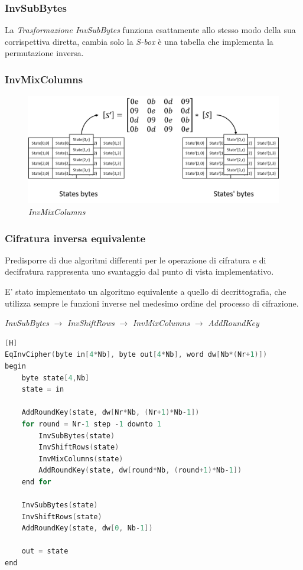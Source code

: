 \documentclass[a4paper,11pt]{article}
\begin{document}
\subsubsection{InvSubBytes}
La \textit{Trasformazione InvSubBytes} funziona esattamente allo stesso modo della sua corrispettiva diretta, cambia solo la \textit{S-box} è una tabella che implementa la permutazione inversa.

\subsubsection{InvMixColumns}
\begin{figure}[H]
    \centering
    \includegraphics[scale=0.4]{invmixcolumns}
    \caption{\textit{InvMixColumns}}
\end{figure}

\subsubsection{Cifratura inversa equivalente}
Predisporre di due algoritmi differenti per le operazione di cifratura e di decifratura rappresenta uno svantaggio dal punto di vista implementativo.

E' stato implementato un algoritmo equivalente a quello di decrittografia, che utilizza sempre le funzioni inverse nel medesimo ordine del processo di cifrazione.

\begin{center}
    \textit{InvSubBytes} $\rightarrow$ \textit{InvShiftRows} $\rightarrow$ \textit{InvMixColumns} $\rightarrow$ \textit{AddRoundKey}
\end{center}
\begin{lstlisting}[language=c, caption={Pseudo Code for the Equivalent Inverse Cipher}, frame=single][H]
EqInvCipher(byte in[4*Nb], byte out[4*Nb], word dw[Nb*(Nr+1)])
begin
    byte state[4,Nb]
    state = in
    
    AddRoundKey(state, dw[Nr*Nb, (Nr+1)*Nb-1])
    for round = Nr-1 step -1 downto 1
        InvSubBytes(state)
        InvShiftRows(state)
        InvMixColumns(state)
        AddRoundKey(state, dw[round*Nb, (round+1)*Nb-1])
    end for
    
    InvSubBytes(state)
    InvShiftRows(state)
    AddRoundKey(state, dw[0, Nb-1])
    
    out = state
end
\end{lstlisting}
\end{document}
